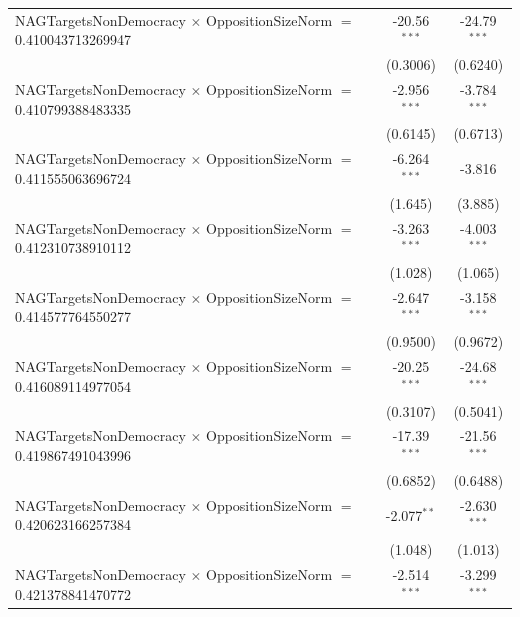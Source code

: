 \begin{tabular}{lcc}
   NAGTargetsNonDemocracy $\times$ OppositionSizeNorm $=$ 0.410043713269947     & -20.56$^{***}$       & -24.79$^{***}$\\   
                                                                                & (0.3006)             & (0.6240)\\   
   NAGTargetsNonDemocracy $\times$ OppositionSizeNorm $=$ 0.410799388483335     & -2.956$^{***}$       & -3.784$^{***}$\\   
                                                                                & (0.6145)             & (0.6713)\\   
   NAGTargetsNonDemocracy $\times$ OppositionSizeNorm $=$ 0.411555063696724     & -6.264$^{***}$       & -3.816\\   
                                                                                & (1.645)              & (3.885)\\   
   NAGTargetsNonDemocracy $\times$ OppositionSizeNorm $=$ 0.412310738910112     & -3.263$^{***}$       & -4.003$^{***}$\\   
                                                                                & (1.028)              & (1.065)\\   
   NAGTargetsNonDemocracy $\times$ OppositionSizeNorm $=$ 0.414577764550277     & -2.647$^{***}$       & -3.158$^{***}$\\   
                                                                                & (0.9500)             & (0.9672)\\   
   NAGTargetsNonDemocracy $\times$ OppositionSizeNorm $=$ 0.416089114977054     & -20.25$^{***}$       & -24.68$^{***}$\\   
                                                                                & (0.3107)             & (0.5041)\\   
   NAGTargetsNonDemocracy $\times$ OppositionSizeNorm $=$ 0.419867491043996     & -17.39$^{***}$       & -21.56$^{***}$\\   
                                                                                & (0.6852)             & (0.6488)\\   
   NAGTargetsNonDemocracy $\times$ OppositionSizeNorm $=$ 0.420623166257384     & -2.077$^{**}$        & -2.630$^{***}$\\   
                                                                                & (1.048)              & (1.013)\\   
   NAGTargetsNonDemocracy $\times$ OppositionSizeNorm $=$ 0.421378841470772     & -2.514$^{***}$       & -3.299$^{***}$\\   

\end{tabular}
